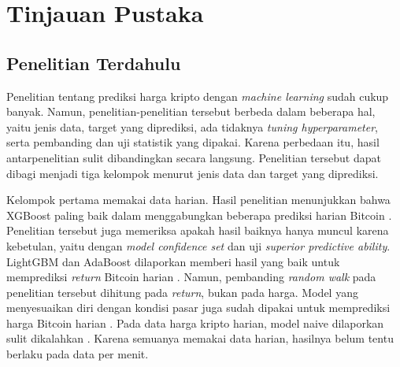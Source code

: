 \chapter{Tinjauan Pustaka}

\newcommand{\keteranganlabel}[1]{\normalfont #1\hfill:}
\newenvironment{keterangan}{%
  \par\vspace{3pt}\noindent dengan:\par\nobreak
  \begin{description}[leftmargin=2.8cm,labelwidth=2.4cm,labelsep=0.4cm,
    align=left,font=\normalfont,topsep=2pt,itemsep=0pt,parsep=0pt,
    before=\let\makelabel\keteranganlabel]%
}{%
  \end{description}\par\vspace{3pt}%
}


\section{Penelitian Terdahulu}
\label{sec:terdahulu}
Penelitian tentang prediksi harga kripto dengan \textit{machine learning}
sudah cukup banyak. Namun, penelitian-penelitian tersebut berbeda dalam
beberapa hal, yaitu jenis data, target yang diprediksi, ada tidaknya
\textit{tuning hyperparameter}, serta pembanding dan uji statistik yang
dipakai. Karena perbedaan itu, hasil antarpenelitian sulit dibandingkan secara
langsung. Penelitian tersebut dapat dibagi menjadi tiga kelompok menurut
jenis data dan target yang diprediksi.

Kelompok pertama memakai data harian. Hasil penelitian menunjukkan bahwa XGBoost paling baik dalam
menggabungkan beberapa prediksi harian Bitcoin \cite{wei2023}. Penelitian
tersebut juga memeriksa apakah hasil baiknya hanya muncul karena kebetulan,
yaitu dengan \textit{model confidence set} dan uji \textit{superior predictive
ability}. LightGBM dan AdaBoost dilaporkan memberi hasil yang baik untuk
memprediksi \textit{return} Bitcoin harian \cite{bouteska2024}. Namun, pembanding
\textit{random walk} pada penelitian tersebut dihitung pada \textit{return},
bukan pada harga. Model yang menyesuaikan diri dengan kondisi pasar juga sudah
dipakai untuk memprediksi harga Bitcoin harian \cite{oprea2026}. Pada data harga
kripto harian, model naive dilaporkan sulit dikalahkan \cite{puoti2024}.
Karena semuanya memakai data harian, hasilnya belum tentu berlaku pada data
per menit.

